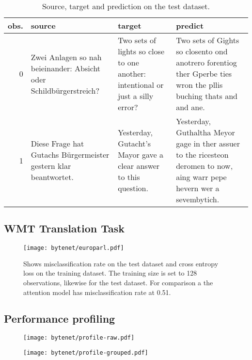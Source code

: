 \begin{table}[h]
\centering
\begin{tabular}{r|p{3.3cm} p{3.3cm} p{3.3cm}}
	obs. & source & target & predict\\ \hline
  0  & Zwei Anlagen so nah beieinander: Absicht oder Schildbürgerstreich? & Two sets of lights so close to one another: intentional or just a silly error? & Two sets of Gights so closento ond anotrero forentiog ther Gperbe ties wron the pllis buching thats and and ane. \\
  1 & Diese Frage hat Gutachs Bürgermeister gestern klar beantwortet. & Yesterday, Gutacht's Mayor gave a clear answer to this question. & Yesterday, Guthaltha Meyor gage in ther assuer to the ricesteon deromen to now, aing warr pepe hevern wer a sevembytich.
\end{tabular}
\caption{Source, target and prediction on the test dataset.}
\end{table}

\clearpage
\subsection{WMT Translation Task}

\begin{figure}[H]
    \centering
    \texttt{[image: bytenet/europarl.pdf]}
    \caption{Shows misclassification rate on the test dataset and cross entropy loss on the training dataset. The training size is set to 128 observations, likewise for the test dataset. For comparison a the attention model has misclassification rate at 0.51.}
\end{figure}

\subsection{Performance profiling}

\begin{figure}[H]
    \centering
    \texttt{[image: bytenet/profile-raw.pdf]}
    \caption{}
\end{figure}


\begin{figure}[H]
    \centering
    \texttt{[image: bytenet/profile-grouped.pdf]}
    \caption{}
\end{figure}
